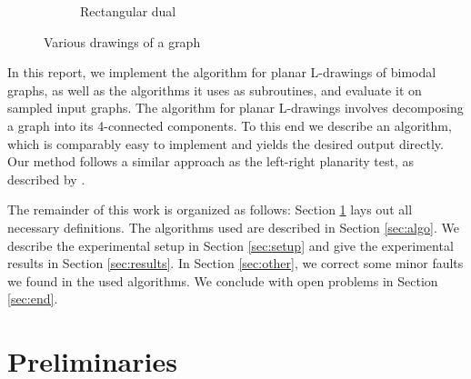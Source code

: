 \documentclass[a4paper]{article}
\begin{document}
\begin{figure}[ht]
    \hfill
    \begin{subfigure}{0.32\textwidth}
        \center
        \caption{Rectangular dual}
        \label{fig:ldrawing:rectdual}
    \end{subfigure}
    \caption{Various drawings of a graph}
    \label{fig:ldrawing}
\end{figure}

In this report, we implement the algorithm for planar L-drawings of bimodal
graphs, as well as the algorithms it uses as subroutines, and evaluate it on
sampled \cite{sampling} input graphs.
The algorithm for planar L-drawings involves decomposing a graph into
its 4-connected components.
To this end we describe an algorithm, which is comparably easy to implement and
yields the desired output directly.
Our method follows a similar approach as the left-right planarity test, as
described by \citet{lrpt}.

The remainder of this work is organized as follows:
Section \ref{sec:prelim} lays out all necessary definitions.
The algorithms used are described in Section \ref{sec:algo}.
We describe the experimental setup in Section \ref{sec:setup} and give the
experimental results in Section \ref{sec:results}.
In Section \ref{sec:other}, we correct some minor faults we found in the used
algorithms.
We conclude with open problems in Section \ref{sec:end}.

\section{Preliminaries}\label{sec:prelim}
\end{document}
